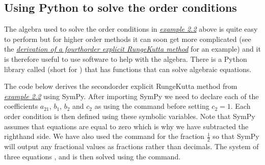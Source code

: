 \documentclass[letterpaper,10pt,english]{jupyterBook}
\begin{document}
\subsection{Using Python to solve the order conditions}
\label{\detokenize{2_ERKs/2.1_ERK_Derivation:using-python-to-solve-the-order-conditions}}
\sphinxAtStartPar
The algebra used to solve the order conditions in {\hyperref[\detokenize{2_ERKs/2.1_ERK_Derivation:rk2-derivation-example}]{\emph{example 2.2}}} above is quite easy to perform but for higher order methods it can soon get more complicated (see the {\hyperref[\detokenize{2_ERKs/2.1_ERK_Derivation:rk4-derivation-example}]{\emph{derivation of a fourth\sphinxhyphen{}order explicit Runge\sphinxhyphen{}Kutta method}}} for an example) and it is therefore useful to use software to help with the algebra. There is a Python library called  (short for ) that has functions that can solve algebraic equations.

\sphinxAtStartPar
The code below derives the second\sphinxhyphen{}order explicit Runge\sphinxhyphen{}Kutta method from {\hyperref[\detokenize{2_ERKs/2.1_ERK_Derivation:rk2-derivation-example}]{\emph{example 2.2}}} using SymPy. After importing SymPy we need to declare each of the coefficients \(a_{21}\), \(b_1\), \(b_2\) and \(c_2\) as  using the  command before setting \(c_2=1\). Each order condition is then defined using these symbolic variables. Note that SymPy assumes that equations are equal to zero which is why we have subtracted the right\sphinxhyphen{}hand side. We have also used the  command for the fraction \(\frac{1}{2}\) so that SymPy will output any fractional values as fractions rather than decimals. The system of three equations ,  and  is then solved using the  command.
\end{document}
